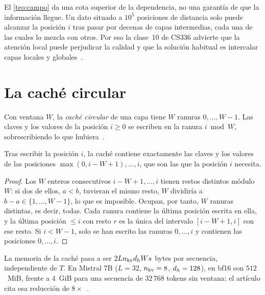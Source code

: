 \begin{observacion}
El \cref{teo:campo} da una cota superior de la dependencia, no una garantía de que la información llegue. Un dato situado a $10^{5}$ posiciones de distancia solo puede alcanzar la posición $i$ tras pasar por decenas de capas intermedias, cada una de las cuales lo mezcla con otros. Por eso la clase~10 de CS336 advierte que la atención local puede perjudicar la calidad y que la solución habitual es intercalar capas locales y globales~\cite{cs336}.
\end{observacion}

\section{La caché circular}

\begin{definicion}\label{def:circular}
Con ventana $W$, la \emph{caché circular} de una capa tiene $W$ ranuras $0,\dots,W-1$. Las claves y los valores de la posición $i\ge 0$ se escriben en la ranura $i\bmod W$, sobrescribiendo lo que hubiera~\cite[§2]{mistral}.
\end{definicion}

\begin{proposicion}\label{prop:circular}
Tras escribir la posición $i$, la caché contiene exactamente las claves y los valores de las posiciones $\max(0,i-W+1),\dots,i$, que son las que la posición $i$ necesita.
\end{proposicion}

\begin{proof}
Los $W$ enteros consecutivos $i-W+1,\dots,i$ tienen restos distintos módulo $W$: si dos de ellos, $a<b$, tuvieran el mismo resto, $W$ dividiría a $b-a\in\{1,\dots,W-1\}$, lo que es imposible. Ocupan, por tanto, $W$ ranuras distintas, es decir, todas. Cada ranura contiene la última posición escrita en ella, y la última posición $\le i$ con resto $r$ es la única del intervalo $[i-W+1,i]$ con ese resto. Si $i<W-1$, solo se han escrito las ranuras $0,\dots,i$ y contienen las posiciones $0,\dots,i$.
\end{proof}

La memoria de la caché pasa a ser $2Ln_{\mathrm{kv}}d_{h} Ws$ bytes por secuencia, independiente de $T$. En Mistral 7B ($L=32$, $n_{\mathrm{kv}}=8$, $d_{h}=128$), en bf16 son $512$~MiB, frente a $4$~GiB para una secuencia de $32\,768$ tokens sin ventana: el artículo cita esa reducción de $8\times$~\cite[§2]{mistral}.

